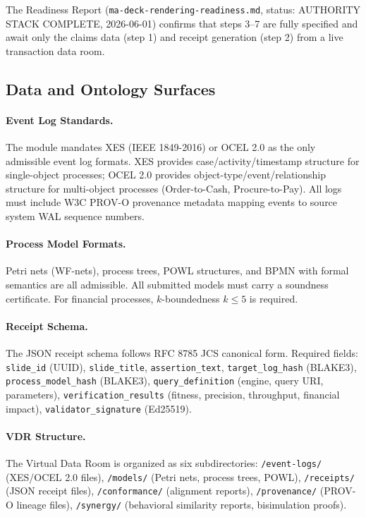 The Readiness Report (\texttt{ma-deck-rendering-readiness.md}, status: AUTHORITY STACK
COMPLETE, 2026-06-01) confirms that steps 3--7 are fully specified and await only the
claims data (step 1) and receipt generation (step 2) from a live transaction data room.

\subsection{Data and Ontology Surfaces}
\label{sec:ma-impl-data}

\paragraph{Event Log Standards.}
The module mandates XES (IEEE 1849-2016) or OCEL 2.0 as the only admissible event log
formats. XES provides case/activity/timestamp structure for single-object processes; OCEL 2.0
provides object-type/event/relationship structure for multi-object processes (Order-to-Cash,
Procure-to-Pay). All logs must include W3C PROV-O provenance metadata mapping events to
source system WAL sequence numbers.

\paragraph{Process Model Formats.}
Petri nets (WF-nets), process trees, POWL structures, and BPMN with formal semantics are all
admissible. All submitted models must carry a soundness certificate. For financial processes,
$k$-boundedness $k \le 5$ is required.

\paragraph{Receipt Schema.}
The JSON receipt schema follows RFC 8785 JCS canonical form. Required fields: \texttt{slide\_id}
(UUID), \texttt{slide\_title}, \texttt{assertion\_text}, \texttt{target\_log\_hash} (BLAKE3),
\texttt{process\_model\_hash} (BLAKE3), \texttt{query\_definition} (engine, query URI,
parameters), \texttt{verification\_results} (fitness, precision, throughput, financial
impact), \texttt{validator\_signature} (Ed25519).

\paragraph{VDR Structure.}
The Virtual Data Room is organized as six subdirectories:
\texttt{/event-logs/} (XES/OCEL 2.0 files),
\texttt{/models/} (Petri nets, process trees, POWL),
\texttt{/receipts/} (JSON receipt files),
\texttt{/conformance/} (alignment reports),
\texttt{/provenance/} (PROV-O lineage files),
\texttt{/synergy/} (behavioral similarity reports, bisimulation proofs).

